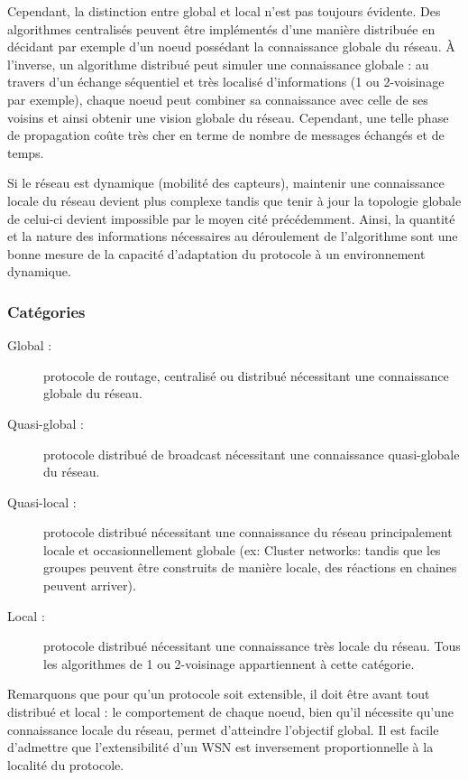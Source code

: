 Cependant, la distinction entre global et local n'est pas toujours évidente. Des algorithmes centralisés peuvent être implémentés d'une manière distribuée en décidant par exemple d'un noeud possédant la connaissance globale du réseau. À l'inverse, un algorithme distribué peut simuler une connaissance globale : au travers d'un échange séquentiel et très localisé d'informations  (1 ou 2-voisinage par exemple), chaque noeud peut combiner sa connaissance avec celle de ses voisins et ainsi obtenir une vision globale du réseau. Cependant, une telle phase de propagation coûte très cher en terme de nombre de messages échangés et de temps.

Si le réseau est dynamique (mobilité des capteurs), maintenir une connaissance locale du réseau devient plus complexe tandis que tenir à jour la topologie globale de celui-ci devient impossible par le moyen cité précédemment. Ainsi, la quantité et la nature des informations nécessaires au déroulement de l'algorithme sont une bonne mesure de la capacité d'adaptation du protocole à un environnement dynamique.   

\subsubsection{Catégories}
\begin{description}
 \item[Global :]protocole de routage, centralisé ou distribué nécessitant une connaissance globale du réseau.
 \item[Quasi-global :]protocole distribué de broadcast nécessitant une connaissance quasi-globale du réseau.
 \item[Quasi-local :]protocole distribué nécessitant une connaissance du réseau principalement locale et occasionnellement globale (ex: Cluster networks: tandis que les groupes peuvent être construits de manière locale, des réactions en chaines peuvent arriver).
 \item[Local :]protocole distribué nécessitant une connaissance très locale du réseau. Tous les algorithmes de 1 ou 2-voisinage appartiennent à cette catégorie.
\end{description}

Remarquons que pour qu'un protocole soit extensible, il doit être avant tout distribué et local :  le comportement de chaque noeud, bien qu'il nécessite qu'une connaissance locale du réseau, permet d'atteindre l'objectif global. Il est facile d'admettre que l'extensibilité d'un WSN est inversement proportionnelle à la localité du protocole.




